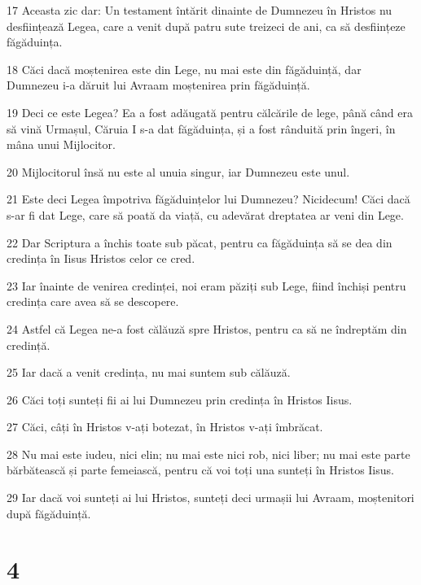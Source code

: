 \par 17 Aceasta zic dar: Un testament întărit dinainte de Dumnezeu în Hristos nu desființează Legea, care a venit după patru sute treizeci de ani, ca să desființeze făgăduința.
\par 18 Căci dacă moștenirea este din Lege, nu mai este din făgăduință, dar Dumnezeu i-a dăruit lui Avraam moștenirea prin făgăduință.
\par 19 Deci ce este Legea? Ea a fost adăugată pentru călcările de lege, până când era să vină Urmașul, Căruia I s-a dat făgăduința, și a fost rânduită prin îngeri, în mâna unui Mijlocitor.
\par 20 Mijlocitorul însă nu este al unuia singur, iar Dumnezeu este unul.
\par 21 Este deci Legea împotriva făgăduințelor lui Dumnezeu? Nicidecum! Căci dacă s-ar fi dat Lege, care să poată da viață, cu adevărat dreptatea ar veni din Lege.
\par 22 Dar Scriptura a închis toate sub păcat, pentru ca făgăduința să se dea din credința în Iisus Hristos celor ce cred.
\par 23 Iar înainte de venirea credinței, noi eram păziți sub Lege, fiind închiși pentru credința care avea să se descopere.
\par 24 Astfel că Legea ne-a fost călăuză spre Hristos, pentru ca să ne îndreptăm din credință.
\par 25 Iar dacă a venit credința, nu mai suntem sub călăuză.
\par 26 Căci toți sunteți fii ai lui Dumnezeu prin credința în Hristos Iisus.
\par 27 Căci, câți în Hristos v-ați botezat, în Hristos v-ați îmbrăcat.
\par 28 Nu mai este iudeu, nici elin; nu mai este nici rob, nici liber; nu mai este parte bărbătească și parte femeiască, pentru că voi toți una sunteți în Hristos Iisus.
\par 29 Iar dacă voi sunteți ai lui Hristos, sunteți deci urmașii lui Avraam, moștenitori după făgăduință.

\chapter{4}

